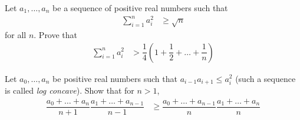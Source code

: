 \documentclass{subfile}
\begin{document}
		\begin{problem}
			Let $a_{1},\ldots,a_{n}$ be a sequence of positive real numbers such that
				\begin{align*}
					\sum_{i=1}^{n}a_{i}^{2}
						& \geq \sqrt{n}
				\end{align*}
			for all $n$. Prove that
				\begin{align*}
					\sum_{i=1}^{n}a_{i}^{2}
						& > \dfrac{1}{4}\left(1+\dfrac{1}{2}+\ldots+\dfrac{1}{n}\right)
				\end{align*}
		\end{problem}
	
		\begin{problem}
			Let $a_{0},\ldots,a_{n}$ be positive real numbers such that $a_{i-1}a_{i+1}\leq a_{i}^2$ (such a sequence is called \textit{log concave}). Show that for $n>1$,
				\begin{align*}
					\dfrac{a_{0}+\ldots+a_{n}}{n+1}\dfrac{a_{1}+\ldots+a_{n-1}}{n-1}
						& \geq\dfrac{a_{0}+\ldots+a_{n-1}}{n}\dfrac{a_{1}+\ldots+a_{n}}{n}
				\end{align*}
		\end{problem}
\end{document}
